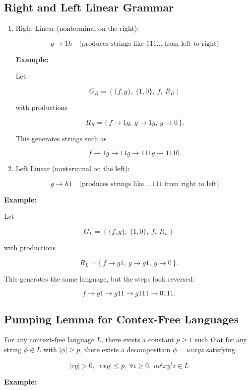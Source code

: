 \documentclass[12pt,a4paper,openany]{article}
\begin{document}
\subsection{Right and Left Linear Grammar}

\begin{enumerate}


\item Right Linear (nonterminal on the right):

\[
g \to 1h \quad \text{(produces strings like } 111\ldots \text{ from left to right)}
\]

\textbf{Example:}

Let

\[
G_R = (\{f, g\},\ \{1,0\},\ f,\ R_R)
\]

with productions

\[
R_R = \{\, f \to 1g,\ g \to 1g,\ g \to 0 \,\}.
\]

This generates strings such as

\[
f \to 1g \to 11g \to 111g \to 1110.
\]

\item Left Linear (nonterminal on the left):

\[
g \to h1 \quad \text{(produces strings like } \ldots 111 \text{ from right to left)}
\]

\end{enumerate}

\textbf{Example:}

Let

\[
G_L = (\{f, g\},\ \{1,0\},\ f,\ R_L)
\]

with productions

\[
R_L = \{\, f \to g1,\ g \to g1,\ g \to 0 \,\}.
\]

This generates the same language, but the steps look reversed:

\[
f \to g1 \to g11 \to g111 \to 0111.
\]

\subsection{Pumping Lemma for Contex-Free Languages}

For any context-free language $L$, there exists a constant $p \geq 1$ such that for any string $\phi \in L$ with $|\phi| \geq p$, there exists a decomposition $\phi = uvxyz$ satisfying:

\[|vy| > 0, \ |vxy| \leq p, \ \forall i \geq 0, \ uv^ixy^iz \in L\]


\textbf{Example:}
\end{document}
